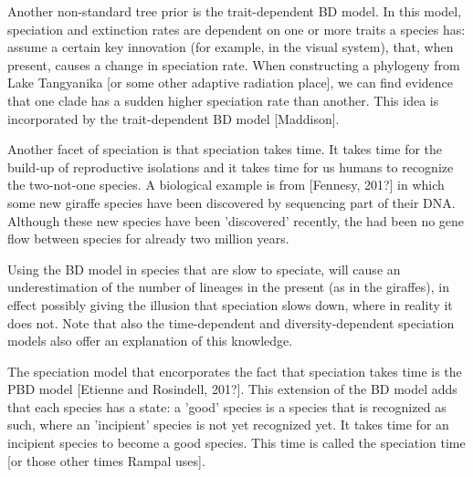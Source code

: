 Another non-standard tree prior is the trait-dependent BD model.
In this model, speciation and extinction rates are dependent
on one or more traits a species has: assume a certain key
innovation (for example, in the visual system), that,
when present, causes a change in speciation
rate. 
When constructing a phylogeny from Lake Tangyanika [or some
other adaptive radiation place], we can find evidence that
one clade has a sudden higher speciation rate than another.
This idea is incorporated by the trait-dependent 
BD model [Maddison].

%
%
%

Another facet of speciation is that speciation takes time. It
takes time for the build-up of reproductive isolations and it
takes time for us humans to recognize the two-not-one species.
A biological example is from [Fennesy, 201?] in which
some new giraffe species have been discovered by sequencing
part of their DNA. Although these new species have been
'discovered' recently, the had been no gene flow between species
for already two million years.

%
%
%

Using the BD model in species that are slow to speciate, will cause
an underestimation of the number of lineages in the present (as in the
giraffes), in effect possibly giving the illusion that speciation 
slows down, where in reality it does not. Note that also the
time-dependent and diversity-dependent speciation models also
offer an explanation of this knowledge.

%
%
%
%
%

The speciation model that encorporates the fact that speciation takes
time is the PBD model [Etienne and Rosindell, 201?]. This extension of the
BD model adds that each species has a state: a 'good' species is
a species that is recognized as such, where an 'incipient' species is
not yet recognized yet. It takes time for an incipient species to
become a good species. This time is called the speciation time [or those
other times Rampal uses].

%
%
%


